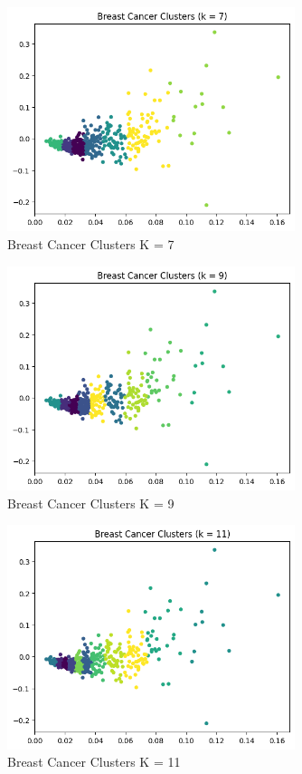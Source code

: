 \documentclass[12pt]{article}
\begin{document}
\begin{enumerate}
\begin{enumerate}
    \begin{figure}[H]
      \centering 
      \includegraphics[width=0.75\textwidth]{2_3_7.png}
      \caption{Breast Cancer Clusters K = 7}
    \end{figure}

    \begin{figure}[H]
      \centering 
      \includegraphics[width=0.75\textwidth]{2_3_9.png}
      \caption{Breast Cancer Clusters K = 9}
    \end{figure}

    \begin{figure}[H]
      \centering 
      \includegraphics[width=0.75\textwidth]{2_3_11.png}
      \caption{Breast Cancer Clusters K = 11}
    \end{figure}


\end{enumerate}
\end{enumerate}
\end{document}
